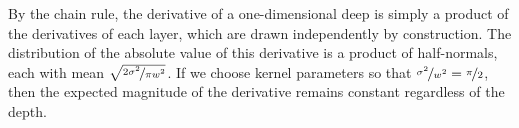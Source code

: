 By the chain rule, the derivative of a one-dimensional deep \gp{} is simply a product of the derivatives of each layer, which are drawn independently by construction.
The distribution of the absolute value of this derivative is a product of half-normals, each with mean $\sqrt{\nicefrac{2 \sigma^2}{\pi w^2}}$.
%
%
If we choose kernel parameters so that ${\nicefrac{\sigma^2}{w^2} = \nicefrac{\pi}{2}}$, then the expected magnitude of the derivative remains constant regardless of the depth.


